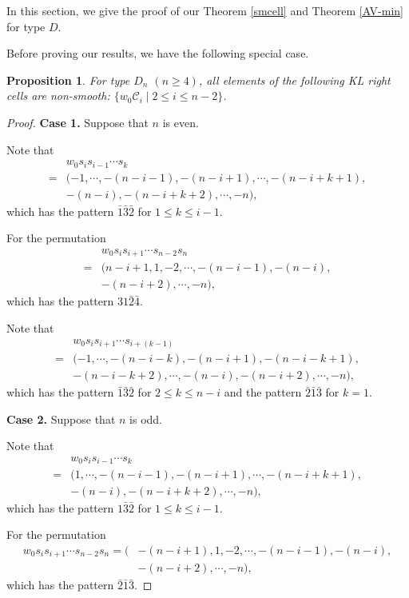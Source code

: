 \documentclass[11pt, reqno]{amsart}
\newtheorem{prop}[Thm]{Proposition}
\theoremstyle{definition}
\numberwithin{equation}{section}
\begin{document}
In this section, we give the proof of our Theorem \ref{smcell} and Theorem \ref{AV-min} for type $D$.

Before proving our results, we have the following special case.
\begin{prop}\label{non-smooth}
    For type $D_n$ $(n\geq 4)$, all elements of the following KL right cells are non-smooth: $\{w_0\mathcal{C}_i\mid 2\leq i \leq n-2\}$.
\end{prop}
\begin{proof}
{\bf Case 1.} Suppose that $n$ is even.

    Note that 
    \begin{align*}
        &w_0s_is_{i-1}\cdots s_k\\
        =&(-1,\cdots,-(n-i-1),-(n-i+1),\cdots,-(n-i+k+1),\\&-(n-i),-(n-i+k+2),\cdots,-n),
    \end{align*}
which has the pattern $\bar{1}\bar{3}\bar{2}$ for $1\leq k\leq i-1$.

For the permutation 
\begin{align*}
    &w_0s_is_{i+1}\cdots s_{n-2}s_n\\=&(n-i+1,1,-2,\cdots,-(n-i-1),-(n-i),\\&-(n-i+2),\cdots,-n),
\end{align*}
which has the pattern $31\bar{2}\bar{4}$.

 Note that 
    \begin{align*}
        &w_0s_is_{i+1}\cdots s_{i+(k-1)}\\
        =&(-1,\cdots,-(n-i-k),-(n-i+1),-(n-i-k+1),\\&-(n-i-k+2),\cdots,-(n-i),-(n-i+2),\cdots,-n),
    \end{align*}
which has the pattern $\bar{1}\bar{3}\bar{2}$ for $2\leq k\leq n-i$ and the pattern $\bar{2}\bar{1}\bar{3}$ for $k=1$.

{\bf Case 2.} Suppose that $n$ is odd.

  Note that 
    \begin{align*}
        &w_0s_is_{i-1}\cdots s_k\\
        =&(1,\cdots,-(n-i-1),-(n-i+1),\cdots,-(n-i+k+1),\\&-(n-i),-(n-i+k+2),\cdots,-n),
    \end{align*}
which has the pattern $1\bar{3}\bar{2}$ for $1\leq k\leq i-1$.   

For the permutation 
\begin{align*}
    w_0s_is_{i+1}\cdots s_{n-2}s_n=(&-(n-i+1),1,-2,\cdots,-(n-i-1),-(n-i),\\&-(n-i+2),\cdots,-n),
\end{align*}
 which has the pattern $\bar{2}\bar{1}\bar{3}$.


\end{proof}
\end{document}

